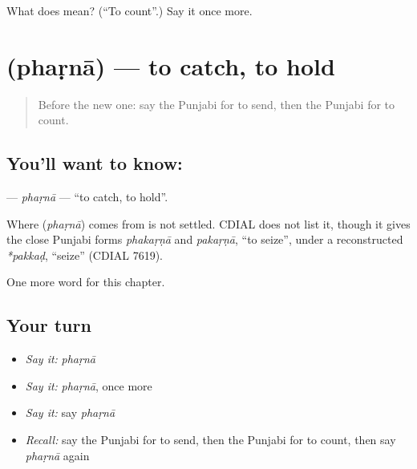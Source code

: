 \begin{tcolorbox}[breakable,colback=teal!4,colframe=teal!35!black,title={Before you move on}]
What does  mean? (\textquotedblleft{}To count\textquotedblright{}.) Say it once more.
\end{tcolorbox}
\section[\texorpdfstring{\pa{ਫੜਨਾ} (phaṛnā)}{ਫੜਨਾ (phaṛnā)}]{ (phaṛnā) — to catch, to hold}

\label{lesson:PA-C61-pharna}



\begin{quote}
Before the new one: say the Punjabi for to send, then the Punjabi for to count.
\end{quote}

\subsection*{You'll want to know: }
\textbf{} — \emph{phaṛnā} — \textquotedblleft{}to catch, to hold\textquotedblright{}.

\begin{cousinweb}
Where \textbf{} (\emph{phaṛnā}) comes from is not settled. CDIAL does not list it, though it gives the close Punjabi forms \emph{phakaṛṇā} and \emph{pakaṛṇā}, \textquotedblleft{}to seize\textquotedblright{}, under a reconstructed \emph{*pakkaḍ}, \textquotedblleft{}seize\textquotedblright{} (CDIAL 7619).
\end{cousinweb}

\begin{grammarlens}[title={What you've built}]
One more word for this chapter.
\end{grammarlens}

\subsection*{Your turn}
\begin{itemize}
\raggedright
  \item \emph{Say it:} \emph{phaṛnā}
  \item \emph{Say it:} \emph{phaṛnā}, once more
  \item \emph{Say it:} say \emph{phaṛnā}
  \item \emph{Recall:} say the Punjabi for to send, then the Punjabi for to count, then say \emph{phaṛnā} again
\end{itemize}

